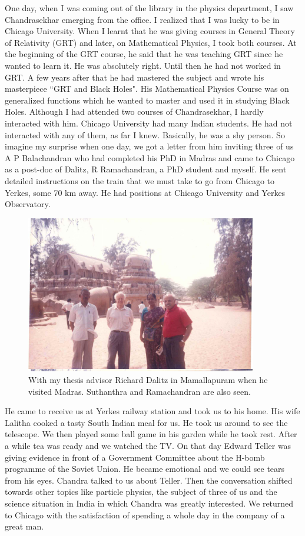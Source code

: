 One day, when I was coming out of the library in the physics department, 
I saw Chandrasekhar emerging from the office. I realized that I was 
lucky to be in Chicago University. When I learnt that he was giving 
courses in General Theory of Relativity (GRT) and later, on Mathematical 
Physics, I took both courses. At the beginning of the GRT course, he 
said that he was tea\-ching GRT since he wanted to learn it. He was 
absolutely right. Until then he had not worked in GRT. A few years after 
that he had mastered the subject and wrote his masterpiece ``GRT and 
Black Holes". His Mathematical Physics Course was on generali\-zed 
functions which he wanted to master and used it in studying Black Holes.
\vskip 1pt
Although I had attended two courses of Chandrasekhar, I hardly 
interacted with him. Chicago University had many Indian students. He had 
not interacted with any of them, as far I knew. Basically, he was a shy 
person. So imagine my surprise when one day, we got a letter from him 
inviting three of us A P Bala\-chandran who had completed his PhD in 
Madras and came to Chicago as a post-doc of Dalitz, R Ramachandran, a PhD student and myself. He sent detailed instructions on the train that we 
must take to go from Chicago to Yerkes, some 70 km away. He had 
positions at Chicago University and Yerkes Observatory.

\begin{figure}[H]
\centering
\includegraphics[width=0.9\textwidth]{images/new-images/07-Rajaji-Dalitz.jpg}
\caption{\small{With my thesis advisor Richard Dalitz in Mamalla\-puram when he visited Madras. Suthanthra and Ramachandran are also seen.}}
\end{figure}
\vspace{-\topsep}
He came to receive us at Yerkes railway station and took us to his home. 
His wife Lalitha cooked a tasty South Indian meal for us. He took us 
around to see the telescope. We then played some ball game in his garden 
while he took rest. After a while tea was ready and we watched the TV. 
On that day Edward Teller was giving evidence in front of a Government 
Committee about the H-bomb programme of the Soviet Union. He became 
emotional and we could see tears from his eyes. Chandra talked to us 
about Teller. Then the conversation shifted towards other to\-pics like 
particle physics, the subject of three of us and the science situation 
in India in which Chandra was greatly intere\-sted. We returned to Chicago 
with the satisfaction of spending a whole day in the company of a great 
man.

